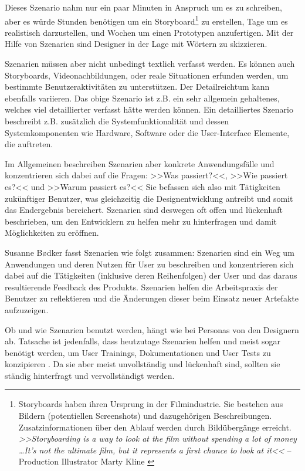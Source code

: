 Dieses Szenario nahm nur ein paar Minuten in Anspruch um es zu schreiben, aber es würde Stunden benötigen um ein Storyboard\footnote{Storyboards haben ihren Ursprung in der Filmindustrie. Sie bestehen aus Bildern (potentiellen Screenshots) und dazugehörigen Beschreibungen. Zusatzinformationen über den Ablauf werden durch Bildübergänge  erreicht. \emph{>>Storyboarding is a way to look at the film without spending a lot of money \ldots It’s not the ultimate film, but it represents a first chance to look at it<<} -- Production Illustrator Marty Kline \citep{Braa:1989}}  zu erstellen, Tage um es realistisch darzustellen, und Wochen um einen Prototypen anzufertigen. Mit der Hilfe von Szenarien sind Designer in der Lage mit Wörtern zu skizzieren. \citep{Saffer:2007} 

\medskip Szenarien müssen aber nicht unbedingt textlich verfasst werden. Es können auch Storyboards, Videonachbildungen, oder reale Situationen erfunden werden, um bestimmte Benutzeraktivitäten zu unterstützen. Der Detailreichtum kann ebenfalls variieren. Das obige Szenario ist z.B. ein sehr allgemein gehaltenes, welches viel detaillierter verfasst hätte werden können. Ein detailliertes Szenario beschreibt z.B. zusätzlich die Systemfunktionalität und dessen Systemkomponenten wie Hardware, Software oder die User-Interface Elemente, die auftreten.

\medskip Im Allgemeinen beschreiben Szenarien aber konkrete Anwendungsfälle und konzentrieren sich dabei auf die Fragen: >>Was passiert?<<, >>Wie passiert es?<< und >>Warum passiert es?<< 
Sie befassen sich also mit Tätigkeiten zukünftiger Benutzer, was gleichzeitig die Designentwicklung antreibt und somit das Endergebnis bereichert. Szenarien sind deswegen oft offen und lückenhaft beschrieben, um den Entwicklern zu helfen mehr zu hinterfragen und damit Möglichkeiten zu eröffnen. \citep{Carroll:1995}

\medskip Susanne B{\o}dker fasst Szenarien wie folgt zusammen:
Szenarien sind ein Weg um Anwendungen und deren Nutzen für User zu beschreiben und konzentrieren sich dabei auf die Tätigkeiten (inklusive deren Reihenfolgen) der User und das daraus resultierende Feedback des Produkts. Szenarien helfen die Arbeitspraxis der Benutzer zu reflektieren und die Änderungen dieser beim Einsatz neuer Artefakte aufzuzeigen. \citep{Bodker:1991}

\medskip Ob und wie Szenarien benutzt werden, hängt wie bei Personas von den Designern ab. Tatsache ist jedenfalls, dass heutzutage Szenarien helfen und meist sogar benötigt werden, um User Trainings, Dokumentationen und User Tests zu konzipieren \citep{Carroll:1995}. Da sie aber meist unvollständig und lückenhaft sind, sollten sie ständig hinterfragt und vervollständigt werden.

